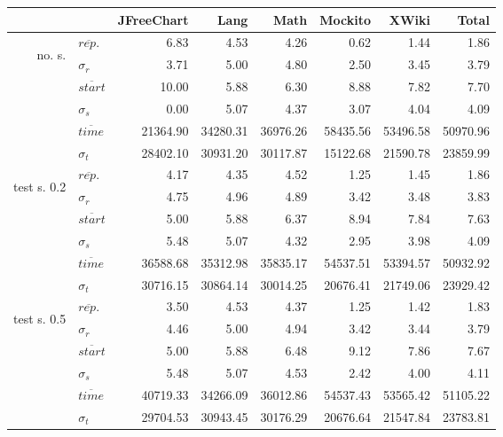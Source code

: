 \begin{tabular}{r l | r r r r r | r}
  \hline
\textbf{} & \textbf{} & \textbf{JFreeChart} & \textbf{Lang} & \textbf{Math} & \textbf{Mockito} & \textbf{XWiki} & \textbf{Total} \\ 
  \hline
    \multirow{6}{*}{\begin{sideways} no. s. \end{sideways}}
& $\overline{rep.}$ & 6.83 & 4.53 & 4.26 & 0.62 & 1.44 & 1.86 \\ 
& $\sigma_{r}$ & 3.71 & 5.00 & 4.80 & 2.50 & 3.45 & 3.79 \\ 
& $\overline{start}$ & 10.00 & 5.88 & 6.30 & 8.88 & 7.82 & 7.70 \\ 
& $\sigma_{s}$ & 0.00 & 5.07 & 4.37 & 3.07 & 4.04 & 4.09 \\ 
& $\overline{time}$ & 21364.90 & 34280.31 & 36976.26 & 58435.56 & 53496.58 & 50970.96 \\ 
& $\sigma_{t}$ & 28402.10 & 30931.20 & 30117.87 & 15122.68 & 21590.78 & 23859.99 \\ 
\hline
	\multirow{6}{*}{\begin{sideways}test s. 0.2 \end{sideways}}

& $\overline{rep.}$ & 4.17 & 4.35 & 4.52 & 1.25 & 1.45 & 1.86 \\ 
& $\sigma_{r}$ & 4.75 & 4.96 & 4.89 & 3.42 & 3.48 & 3.83 \\ 
& $\overline{start}$ & 5.00 & 5.88 & 6.37 & 8.94 & 7.84 & 7.63 \\ 
& $\sigma_{s}$ & 5.48 & 5.07 & 4.32 & 2.95 & 3.98 & 4.09 \\ 
& $\overline{time}$ & 36588.68 & 35312.98 & 35835.17 & 54537.51 & 53394.57 & 50932.92 \\ 
& $\sigma_{t}$ & 30716.15 & 30864.14 & 30014.25 & 20676.41 & 21749.06 & 23929.42 \\ 

\hline
	\multirow{6}{*}{\begin{sideways}test s. 0.5 \end{sideways}}
	
& $\overline{rep.}$ & 3.50 & 4.53 & 4.37 & 1.25 & 1.42 & 1.83 \\ 
& $\sigma_{r}$ & 4.46 & 5.00 & 4.94 & 3.42 & 3.44 & 3.79 \\ 
& $\overline{start}$ & 5.00 & 5.88 & 6.48 & 9.12 & 7.86 & 7.67 \\ 
& $\sigma_{s}$ & 5.48 & 5.07 & 4.53 & 2.42 & 4.00 & 4.11 \\ 
& $\overline{time}$ & 40719.33 & 34266.09 & 36012.86 & 54537.43 & 53565.42 & 51105.22 \\ 
& $\sigma_{t}$ & 29704.53 & 30943.45 & 30176.29 & 20676.64 & 21547.84 & 23783.81 \\ 


\end{tabular}
